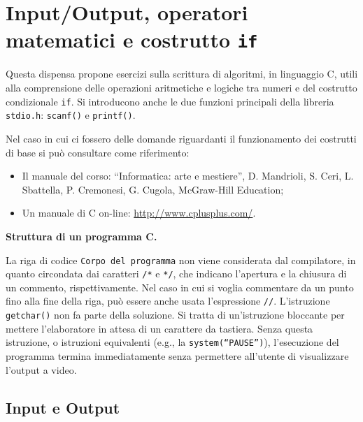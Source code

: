\documentclass[oneside]{scrbook}
\begin{document}
\chapter{Input/Output, operatori matematici e costrutto \texttt{if}}

Questa dispensa propone esercizi sulla scrittura di algoritmi, in linguaggio C, utili alla comprensione delle operazioni aritmetiche e logiche tra numeri e del costrutto condizionale \texttt{if}. Si introducono anche le due funzioni principali della libreria \texttt{stdio.h}: \texttt{scanf()} e \texttt{printf()}.


Nel caso in cui ci fossero delle domande riguardanti il funzionamento dei costrutti di base si pu\`o consultare come riferimento:
\begin{itemize}
		\item Il manuale del corso: ``Informatica: arte e mestiere'', D. Mandrioli, S. Ceri, L. Sbattella, P. Cremonesi, G. Cugola, McGraw-Hill Education;
		\item Un manuale di C on-line: \url{http://www.cplusplus.com/}.
\end{itemize}

\textbf{Struttura di un programma C.}



La riga di codice \texttt{Corpo del programma} non viene considerata dal compilatore, in quanto circondata dai caratteri \texttt{/*} e \texttt{*/}, che indicano l'apertura e la chiusura di un commento, rispettivamente. Nel caso in cui si voglia commentare da un punto fino alla fine della riga, pu\`o essere anche usata l'espressione \texttt{//}. L'istruzione \texttt{getchar()} non fa parte della soluzione. Si tratta di un'istruzione bloccante per mettere l'elaboratore in attesa di un carattere da tastiera. Senza questa istruzione, o istruzioni equivalenti (e.g., la \texttt{system(``PAUSE'')}), l'esecuzione del programma termina immediatamente senza permettere all'utente di visualizzare l'output a video.

\section{Input e Output}
\end{document}
